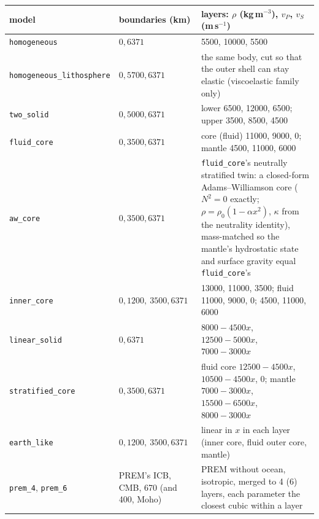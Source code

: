 \documentclass[11pt]{article}
\numberwithin{equation}{section}
\newcommand{\code}[1]{\texttt{#1}}
\begin{document}
\begin{center}
\small
\begin{tabular}{@{}lP{2.5cm}P{8.8cm}@{}}
\toprule
model & boundaries (km) & layers: $\rho$ (kg\,m$^{-3}$), $v_P$, $v_S$ (m\,s$^{-1}$) \\
\midrule
\code{homogeneous} & $0, 6371$ & 5500, 10000, 5500 \\
\code{homogeneous\_lithosphere} & $0, 5700, 6371$ & the same body, cut so that the outer shell can stay elastic (viscoelastic family only) \\
\code{two\_solid} & $0, 5000, 6371$ & lower 6500, 12000, 6500; upper 3500, 8500, 4500 \\
\code{fluid\_core} & $0, 3500, 6371$ & core (fluid) 11000, 9000, 0; mantle 4500, 11000, 6000 \\
\code{aw\_core} & $0, 3500, 6371$ & \code{fluid\_core}'s neutrally stratified twin: a closed-form Adams--Williamson core ($N^2 = 0$ exactly; $\rho = \rho_0(1-\alpha x^2)$, $\kappa$ from the neutrality identity), mass-matched so the mantle's hydrostatic state and surface gravity equal \code{fluid\_core}'s \\
\code{inner\_core} & $0, 1200,\allowbreak\ 3500, 6371$ & 13000, 11000, 3500; fluid 11000, 9000, 0; 4500, 11000, 6000 \\
\code{linear\_solid} & $0, 6371$ & $8000-4500x$, $12500-5000x$, $7000-3000x$ \\
\code{stratified\_core} & $0, 3500, 6371$ & fluid core $12500-4500x$, $10500-4500x$, 0; mantle $7000-3000x$, $15500-6500x$, $8000-3000x$ \\
\code{earth\_like} & $0, 1200,\allowbreak\ 3500, 6371$ & linear in $x$ in each layer (inner core, fluid outer core, mantle) \\
\code{prem\_4}, \code{prem\_6} & PREM's ICB, CMB, 670 (and 400, Moho) & PREM without ocean, isotropic, merged to 4 (6) layers, each parameter the closest cubic within a layer \\
\bottomrule
\end{tabular}
\end{center}
\end{document}
